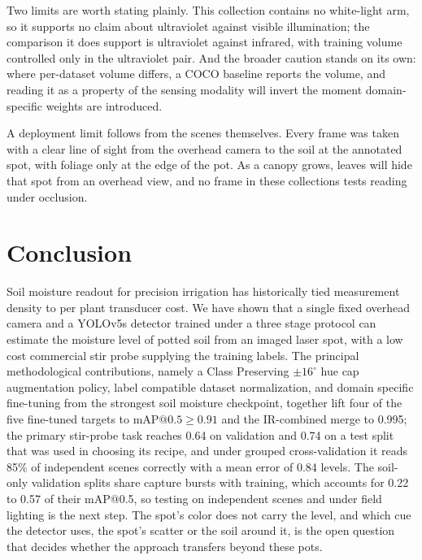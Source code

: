 ﻿\documentclass[journal]{IEEEtran}
\begin{document}
Two limits are worth stating plainly. This collection contains no white-light arm, so it supports no claim about ultraviolet against visible illumination; the comparison it does support is ultraviolet against infrared, with training volume controlled only in the ultraviolet pair. And the broader caution stands on its own: where per-dataset volume differs, a COCO baseline reports the volume, and reading it as a property of the sensing modality will invert the moment domain-specific weights are introduced.

A deployment limit follows from the scenes themselves. Every frame was taken with a clear line of sight from the overhead camera to the soil at the annotated spot, with foliage only at the edge of the pot. As a canopy grows, leaves will hide that spot from an overhead view, and no frame in these collections tests reading under occlusion.

\section{Conclusion}
\label{sec:conclusion}
Soil moisture readout for precision irrigation has historically tied measurement density to per plant transducer cost. We have shown that a single fixed overhead camera and a YOLOv5s detector trained under a three stage protocol can estimate the moisture level of potted soil from an imaged laser spot, with a low cost commercial stir probe supplying the training labels. The principal methodological contributions, namely a Class Preserving $\pm 16^{\circ}$ hue cap augmentation policy, label compatible dataset normalization, and domain specific fine-tuning from the strongest soil moisture checkpoint, together lift four of the five fine-tuned targets to $\text{mAP@0.5} \geq 0.91$ and the IR-combined merge to 0.995; the primary stir-probe task reaches 0.64 on validation and 0.74 on a test split that was used in choosing its recipe, and under grouped cross-validation it reads 85\% of independent scenes correctly with a mean error of 0.84 levels. The soil-only validation splits share capture bursts with training, which accounts for 0.22 to 0.57 of their mAP@0.5, so testing on independent scenes and under field lighting is the next step. The spot's color does not carry the level, and which cue the detector uses, the spot's scatter or the soil around it, is the open question that decides whether the approach transfers beyond these pots.



\end{document}

